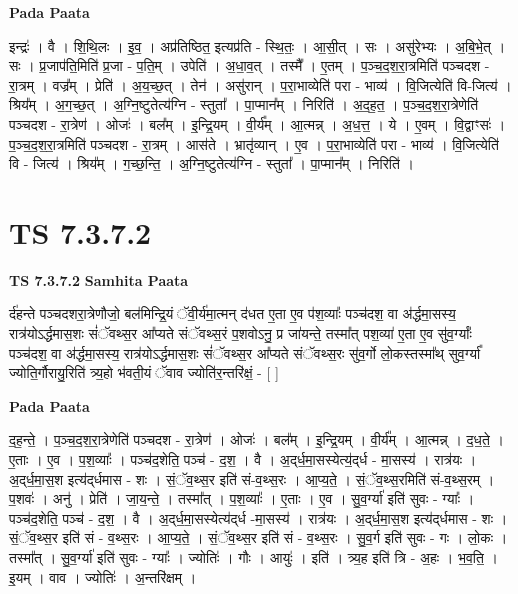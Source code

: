\documentclass[17pt]{extarticle}
\begin{document}
\textbf{Pada Paata} \newline

इन्द्रः॑ । वै । शि॒थि॒लः । इ॒व॒ । अप्र॑तिष्ठित॒ इत्यप्र॑ति - स्थि॒तः॒ । आ॒सी॒त् । सः । असु॑रेभ्यः । अ॒बि॒भे॒त् । सः । प्र॒जाप॑ति॒मिति॑ प्र॒जा - प॒ति॒म् । उपेति॑ । अ॒धा॒व॒त् । तस्मै᳚ । ए॒तम् । प॒ञ्च॒द॒श॒रा॒त्रमिति॑ पञ्चदश - रा॒त्रम् । वज्र᳚म् । प्रेति॑ । अ॒य॒च्छ॒त् । तेन॑ । असु॑रान् । प॒रा॒भाव्येति॑ परा - भाव्य॑ । वि॒जित्येति॑ वि-जित्य॑ । श्रिय᳚म् । अ॒ग॒च्छ॒त् । अ॒ग्नि॒ष्टुतेत्य॑ग्नि - स्तुता᳚ । पा॒प्मान᳚म् । निरिति॑ । अ॒द॒ह॒त॒ । प॒ञ्च॒द॒श॒रा॒त्रेणेति॑ पञ्चदश - रा॒त्रेण॑ । ओजः॑ । बल᳚म् । इ॒न्द्रि॒यम् । वी॒र्य᳚म् । आ॒त्मन्न् । अ॒ध॒त्त॒ । ये । ए॒वम् । वि॒द्वाꣳसः॑ । प॒ञ्च॒द॒श॒रा॒त्रमिति॑ पञ्चदश - रा॒त्रम् । आस॑ते । भ्रातृ॑व्यान् । ए॒व । प॒रा॒भाव्येति॑ परा - भाव्य॑ । वि॒जित्येति॑ वि - जित्य॑ । श्रिय᳚म् । ग॒च्छ॒न्ति॒ । अ॒ग्नि॒ष्टुतेत्य॑ग्नि - स्तुता᳚ । पा॒प्मान᳚म् । निरिति॑ ।  \newline





\section{ TS 7.3.7.2 }

\textbf{TS 7.3.7.2 } \newline
\textbf{Samhita Paata} \newline

र्द॑हन्ते पञ्चदशरा॒त्रेणौजो॒ बल॑मिन्द्रि॒यं ॅवी॒र्य॑मा॒त्मन् द॑धत ए॒ता ए॒व प॑श॒व्याः᳚ पञ्च॑दश॒ वा अ॑र्द्धमा॒सस्य॒ रात्र॑योऽर्द्धमास॒शः सं॑ॅवथ्स॒र आ᳚प्यते संॅवथ्स॒रं प॒शवोऽनु॒ प्र जा॑यन्ते॒ तस्मा᳚त् पश॒व्या॑ ए॒ता ए॒व सु॑व॒र्ग्याः᳚ पञ्च॑दश॒ वा अ॑र्द्धमा॒सस्य॒ रात्र॑योऽर्द्धमास॒शः सं॑ॅवथ्स॒र आ᳚प्यते संॅवथ्स॒रः सु॑व॒र्गो लो॒कस्तस्मा᳚थ् सुव॒र्ग्या᳚ ज्योति॒र्गौरायु॒रिति॑ त्र्य॒हो भ॑वती॒यं ॅवाव ज्योति॑र॒न्तरि॑क्षं॒ - [  ] \newline

\textbf{Pada Paata} \newline

द॒ह॒न्ते॒ । प॒ञ्च॒द॒श॒रा॒त्रेणेति॑ पञ्चदश - रा॒त्रेण॑ । ओजः॑ । बल᳚म् । इ॒न्द्रि॒यम् । वी॒र्य᳚म् । आ॒त्मन्न् । द॒ध॒ते॒ । ए॒ताः । ए॒व । प॒श॒व्याः᳚ । पञ्च॑द॒शेति॒ पञ्च॑ - द॒श॒ । वै । अ॒द्‌र्ध॒मा॒सस्येत्य॒॑द्‌र्ध - मा॒सस्य॑ । रात्र॑यः । अ॒द्‌र्ध॒मा॒स॒श इत्य॑द्‌र्धमास - शः । सं॒ॅव॒थ्स॒र इति॑ सं-व॒थ्स॒रः । आ॒प्य॒ते॒ । सं॒ॅव॒थ्स॒रमिति॑ सं-व॒थ्स॒रम् । प॒शवः॑ । अनु॑ । प्रेति॑ । जा॒य॒न्ते॒ । तस्मा᳚त् । प॒श॒व्याः᳚ । ए॒ताः । ए॒व । सु॒व॒र्ग्या॑ इति॑ सुवः - ग्याः᳚ । पञ्च॑द॒शेति॒ पञ्च॑ - द॒श॒ । वै । अ॒द्‌र्ध॒मा॒सस्येत्य॑द्‌र्ध -मा॒सस्य॑ । रात्र॑यः । अ॒द्‌र्ध॒मा॒स॒श इत्य॑द्‌र्धमास - शः । सं॒ॅव॒थ्स॒र इति॑ सं - व॒थ्स॒रः । आ॒प्य॒ते॒ । सं॒ॅव॒थ्स॒र इति॑ सं - व॒थ्स॒रः । सु॒व॒र्ग इति॑ सुवः - गः । लो॒कः । तस्मा᳚त् । सु॒व॒र्ग्या॑ इति॑ सुवः - ग्याः᳚ । ज्योतिः॑ । गौः । आयुः॑ । इति॑ । त्र्य॒ह इति॑ त्रि - अ॒हः । भ॒व॒ति॒ । इ॒यम् । वाव । ज्योतिः॑ । अ॒न्तरि॑क्षम् ।  \newline
\end{document}
